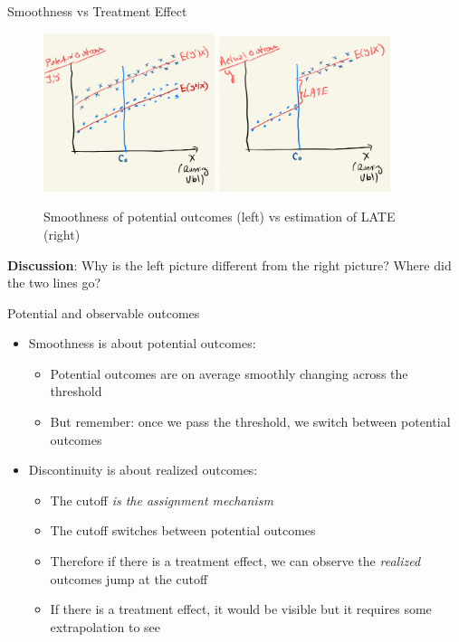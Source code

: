 \documentclass{beamer}
\begin{document}
\begin{frame}{Smoothness vs Treatment Effect}
\begin{figure}
    \centering
    \includegraphics[width=5cm]{./lecture_includes/smoothness.png}
    \qquad
    \includegraphics[width=5cm]{./lecture_includes/LATE_RDD.png}
    \caption{Smoothness of potential outcomes (left) vs estimation of LATE (right)}
\end{figure}

\textbf{Discussion}: Why is the left picture different from the right picture? Where did the two lines go?

\end{frame}



\begin{frame}{Potential and observable outcomes}

\begin{itemize}

\item Smoothness is about potential outcomes: 
	\begin{itemize}
	\item Potential outcomes are on average smoothly changing across the threshold 
	\item But remember: once we pass the threshold, we switch between potential outcomes
	\end{itemize}
\item Discontinuity is about realized outcomes: 
	\begin{itemize}
	\item The cutoff \emph{is the assignment mechanism}
	\item The cutoff switches between potential outcomes
	\item Therefore if there is a treatment effect, we can observe the \emph{realized} outcomes jump at the cutoff
	\item If there is a treatment effect, it would be visible but it requires some extrapolation to see
	\end{itemize}
\end{itemize}


\end{frame}
\end{document}
